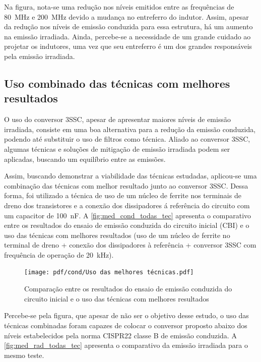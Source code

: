     Na figura, nota-se uma redução nos níveis emitidos entre as frequências de \SI{80}{\mega\hertz} e \SI{200}{\mega\hertz} devido a mudança no entreferro do indutor. Assim, apesar da redução nos níveis de emissão conduzida para essa estrutura, há um aumento na emissão irradiada. Ainda, percebe-se a necessidade de um grande cuidado ao projetar os indutores, uma vez que seu entreferro é um dos grandes responsáveis pela emissão irradiada. 
    \subsection{Uso combinado das técnicas com melhores resultados} \label{cap:result_tecnicas_total}
    
    O uso do conversor 3SSC, apesar de apresentar maiores níveis de emissão irradiada, consiste em uma boa alternativa para a redução da emissão conduzida, podendo até substituir o uso de filtros como técnica. Aliado ao conversor 3SSC, algumas técnicas e soluções de mitigação de emissão irradiada podem ser aplicadas, buscando um equilíbrio entre as emissões. 
    
    Assim, buscando demonstrar a viabilidade das técnicas estudadas, aplicou-se uma combinação das técnicas com melhor resultado junto ao conversor 3SSC. Dessa forma, foi utilizado a técnica de uso de um núcleo de ferrite nos terminais de dreno dos transistores e a conexão dos dissipadores á referência do circuito com um capacitor de \SI{100}{\nano\farad}. A \autoref{fig:med_cond_todas_tec} apresenta o comparativo entre os resultados do ensaio de emissão conduzida do circuito inicial (CBI) e o uso das técnicas com melhores resultados (uso de um núcleo de ferrite no terminal de dreno + conexão dos dissipadores à referência + conversor 3SSC com frequência de operação de \SI{20}{\kilo\hertz}).
    
    \begin{figure}[H]
    	\centering
    	\caption{Comparação entre os resultados do ensaio de emissão conduzida do circuito inicial e o uso das técnicas com melhores resultados}
    	\texttt{[image: pdf/cond/Uso das melhores técnicas.pdf]}
    	\label{fig:med_cond_todas_tec}
    \end{figure}
    
    Percebe-se pela figura, que apesar de não ser o objetivo desse estudo, o uso das técnicas combinadas foram capazes de colocar o conversor proposto abaixo dos níveis estabelecidos pela norma CISPR22 classe B de emissão conduzida. A \autoref{fig:med_rad_todas_tec} apresenta o comparativo da emissão irradiada para o mesmo teste. 
    
